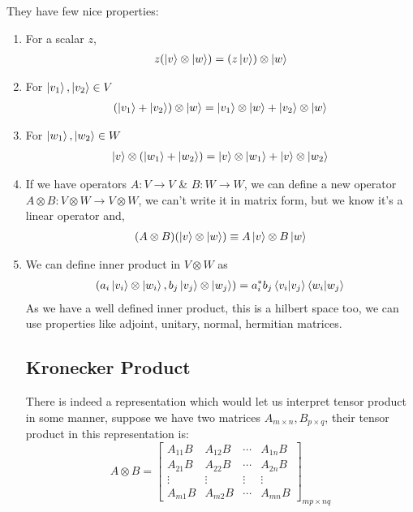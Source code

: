 They have few nice properties:
\begin{enumerate}
    \item For a scalar $z$,
    \begin{align}
        z(\ket{v} \otimes \ket{w}) =
        (z\ket{v}) \otimes \ket{w}
    \end{align}
    \item For $\ket{v_1}, \ket{v_2} \in V$
    \begin{align}
        (\ket{v_1} + \ket{v_2}) \otimes \ket{w} = \ket{v_1} \otimes \ket{w} + \ket{v_2} \otimes \ket{w}
    \end{align}
    \item For $\ket{w_1}, \ket{w_2} \in W$
    \begin{align}
        \ket{v} \otimes (\ket{w_1} + \ket{w_2}) = \ket{v} \otimes \ket{w_1} + \ket{v} \otimes \ket{w_2}
    \end{align}
    \item 
    If we have operators $A:V\xrightarrow{}V$ \& $B:W\xrightarrow{}W$, we can define a new operator $A \otimes B : V \otimes W \xrightarrow{} V \otimes W$, we can't write it in matrix form, but we know it's a linear operator and,
    \begin{align}
        (A \otimes B)(\ket{v} \otimes \ket{w}) \equiv A\ket{v} \otimes B\ket{w}
    \end{align}
    \item We can define inner product in $V \otimes W$ as
    \begin{align}
        (a_i\ket{v_i} \otimes \ket{w_i},
        b_j\ket{v_j} \otimes \ket{w_j}) = a_i^*b_j \braket{v_i|v_j}\braket{w_i|w_j}
    \end{align}
    As we have a well defined inner product, this is a hilbert space too, we can use properties like adjoint, unitary, normal, hermitian matrices.

    \subsection{Kronecker Product}
    There is indeed a representation which would let us interpret tensor product in some manner, suppose we have two matrices $A_{m\times n}, B_{p \times q}$,
    their tensor product in this representation is:
    \begin{equation}
        A \otimes B =
        \begin{bmatrix}
            A_{11}B & A_{12}B & \cdots & A_{1n}B \\
            A_{21}B & A_{22}B & \cdots &
            A_{2n}B \\
            \vdots & \vdots & \vdots & \vdots \\
            A_{m1}B & A_{m2}B & \cdots & A_{mn}B
        \end{bmatrix}_{mp \times nq}
    \end{equation}


\end{enumerate}
